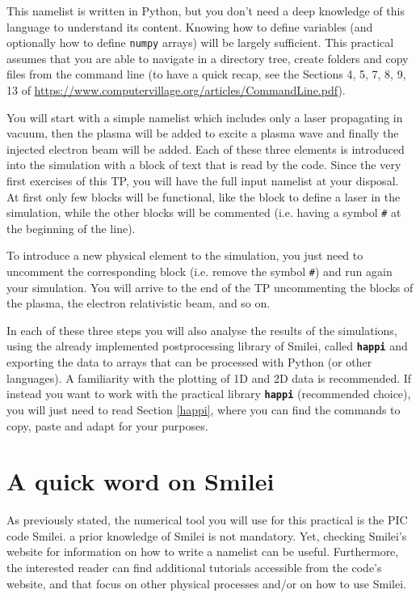 \documentclass{article}
\newcommand{\smilei}{{\sc Smilei}\xspace}
\newcommand{\commandline}[1]{\texttt{\textbf{#1}}}
\begin{document}
This namelist is written in Python, but you don't need a deep knowledge of this language to understand its content. Knowing how to define variables (and optionally how to define \texttt{numpy} arrays) will be largely sufficient. This practical assumes that you are able to navigate in a directory tree, create folders and copy files from the command line (to have a quick recap, see the Sections 4, 5, 7, 8, 9, 13 of \url{https://www.computervillage.org/articles/CommandLine.pdf}). 

You will start with a simple namelist which includes only a laser propagating in vacuum, then the plasma will be added to excite a plasma wave and finally the injected electron beam will be added. Each of these three elements is introduced into the simulation with a block of text that is read by the code. Since the very first exercises of this TP, you will have the full input namelist at your disposal. At first only few blocks will be functional, like the block to define a laser in the simulation, while the other blocks will be commented (i.e. having a symbol \texttt{\#} at the beginning of the line).

To introduce a new physical element to the simulation, you just need to uncomment the corresponding block (i.e. remove the symbol \texttt{\#}) and run  again your simulation. You will arrive to the end of the TP uncommenting the blocks of the plasma, the electron relativistic beam, and so on.

In each of these three steps you will also analyse the results of the simulations, using the already implemented postprocessing library of \smilei, called \commandline{happi} and exporting the data to arrays that can be processed with Python (or other languages).  A familiarity with the plotting of 1D and 2D data is recommended. If instead you want to work with the practical library \commandline{happi} (recommended choice), you will just need to read Section \ref{happi}, where you can find the commands to copy, paste and adapt  for your purposes.

\section*{A quick word on \smilei} %

As previously stated, the numerical tool you will use for this practical is the PIC code \smilei. a prior knowledge of \smilei is not mandatory.
Yet, checking \smilei's website for information on how to write a namelist can be useful. 
Furthermore, the interested reader can find additional tutorials accessible from the code's website, and that focus on other physical processes and/or on how to use \smilei.
\end{document}
